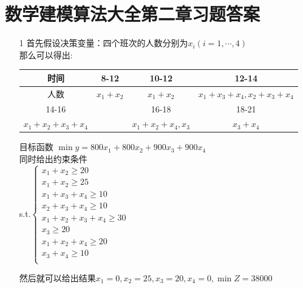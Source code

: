 \documentclass[a4paper,20pt]{article}
\begin{document}
    \section{数学建模算法大全第二章习题答案}
\begin{itemize}
    \item[1]首先假设决策变量：四个班次的人数分别为$x_i(i=1,\cdots,4)$
    \\那么可以得出:\begin{table}[H]
        \begin{tabular}{|c|c|c|c|}
            \hline
            时间 & 8-12 & 10-12 & 12-14 \\ 
            \hline
            人数 & $x_1+x_2$ & $x_1+x_2$ &$x_1+x_3+x_4,x_2+x_3+x_4$ \\
            \hline
            14-16 &  &16-18 &18-21\\
            \hline
            $x_1+x_2+x_3+x_4$ & & $x_1+x_2+x_4,x_3$ & $x_3+x_4$ \\
            \hline
        \end{tabular}
    \end{table}
    \par \noindent  
    
        目标函数 $\min y = 800x_1 + 800x_2+900x_3+900x_4$
        \\同时给出约束条件
        \\s.t.$\left\{\begin{matrix}
            x_1+x_2 \geqslant  20\\
            x_1+x_2 \geqslant  25\\
            x_1+x_3+x_4 \geqslant  10\\
            x_2+x_3+x_4 \geqslant  10\\
            x_1+x_2+x_3+x_4 \geqslant  30\\
            x_3 \geqslant 20\\
            x_1+x_2+x_4 \geqslant  20\\
            x_3+x_4 \geqslant  10\\
        \end{matrix}\right.$
        
    \par \noindent 然后就可以给出结果$ x_1=0
    ,x_2=25
    ,x_3=20
    ,x_4=0,\min Z=38000$
\end{itemize}
\end{document}
